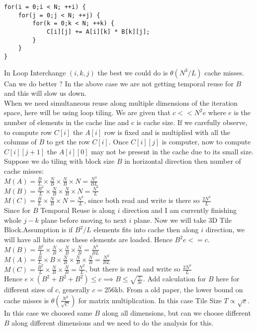 \documentclass{article}
\begin{document}
\begin{lstlisting}
for(i = 0;i < N; ++i) {
    for(j = 0;j < N; ++j) {
        for(k = 0;k < N; ++k) {
            C[i][j] += A[i][k] * B[k][j];
        }
    }
}
\end{lstlisting}
In Loop Interchange $(i,k,j)$ the best we could do is $\theta(N^3/L)$ cache misses. Can we do better ? In the above case we are not getting temporal reuse for $B$ and this will slow us down. \\

When we need simultaneous reuse along multiple dimensions of the iteration space, here will be using loop tiling. We are given that $c << N^2e$ where $e$ is the number of elements in the cache line and c is cache size. If we carefully observe, to compute row $C[i]$ the $A[i]$ row is fixed and is multiplied with all the columns of $B$ to get the row $C[i]$. Once $C[i][j]$ is computer, now to compute $C[i][j+1]$ the $A[i][0]$ may not be present in the cache due to its small size. \\

Suppose we do tiling with block size $B$ in horizontal direction then number of cache misses: \\
$M(A) = \frac{B}{L} \times \frac{N}{B} \times \frac{N}{B} \times N = \frac{N^3}{BL}$ \\
$M(B) = \frac{B^2}{L} \times \frac{N}{B} \times \frac{N}{B} \times N = \frac{N^3}{L}$ \\
$M(C) = \frac{B}{L} \times \frac{N}{B} \times N = \frac{N^2}{L}$, since both read and write is there so $\frac{2N^2}{L}$ \\

Since for $B$ Temporal Reuse is along $i$ direction and I am currently finishing whole $j-k$ plane before moving to next $i$ plane. Now we will take 3D Tile Block.Assumption is if $B^2/L$ elements fits into cache then along $i$ direction, we will have all hits once these elements are loaded. Hence $B^2e <= c$. \\

$M(B) = \frac{B^2}{L} \times \frac{N}{B} \times \frac{N}{B} \times \frac{N}{B} = \frac{N^3}{BL}$ \\
$M(A) = \frac{B}{L} \times B \times \frac{N}{B} \times \frac{N}{B} \times \frac{N}{B} = \frac{N^3}{BL}$ \\
$M(C) = \frac{B^2}{L} \times \frac{N}{B} \times \frac{N}{B} = \frac{N^2}{L}$, but there is read and write so $\frac{2N^2}{L}$ \\

Hence $e \times (B^2 + B^2 + B^2) \leq c \implies B \leq \sqrt{\frac{c}{3e}}$. Add calculation for $B$ here for different sizes of $c$, generally $c = 256$kb. From a old paper, the lower bound on cache misses is $\theta(\frac{N^3}{\sqrt{C}})$ for matrix multiplication. In this case Tile Size $T \propto \sqrt{c}$. In this case we choosed same $B$ along all dimensions, but can we choose different $B$ along different dimensions and we need to do the analysis for this. \\
\end{document}
